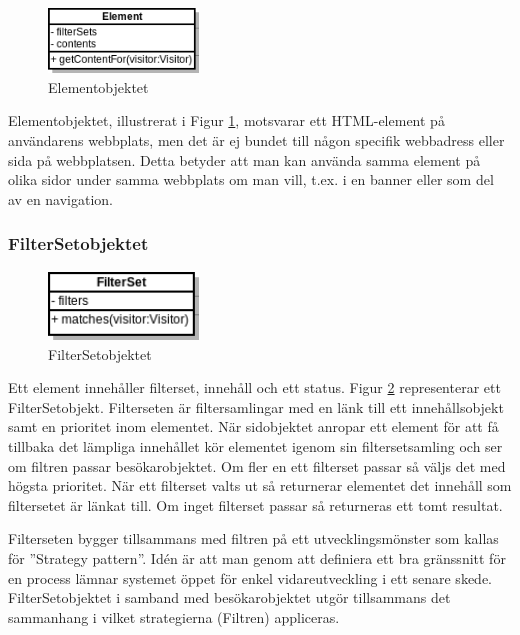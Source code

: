 \begin{figure}[h!]
\centering
\includegraphics[width=40mm]{assets/images/umlElement.png}
\caption{Elementobjektet}
\label{elementuml}
\end{figure}

Elementobjektet, illustrerat i Figur \ref{elementuml}, motsvarar ett HTML-element på användarens webbplats, men det är ej bundet till någon specifik webbadress eller sida på webbplatsen. Detta betyder att man kan använda samma element på olika sidor under samma webbplats om man vill, t.ex. i en banner eller som del av en navigation.

\subsubsection{FilterSetobjektet}

\begin{figure}[h!]
\centering
\includegraphics[width=40mm]{assets/images/umlFilterSet.png}
\caption{FilterSetobjektet}
\label{filtersetuml}
\end{figure}

Ett element innehåller filterset, innehåll och ett status. Figur \ref{filtersetuml} representerar ett FilterSetobjekt. Filterseten är filtersamlingar med en länk till ett innehållsobjekt samt en prioritet inom elementet. När sidobjektet anropar ett element för att få tillbaka det lämpliga innehållet kör elementet igenom sin filtersetsamling och ser om filtren passar besökarobjektet. Om fler en ett filterset passar så väljs det med högsta prioritet. När ett filterset valts ut så returnerar elementet det innehåll som filtersetet är länkat till. Om inget filterset passar så returneras ett tomt resultat.

Filterseten bygger tillsammans med filtren på ett utvecklingsmönster som kallas för ''Strategy pattern''. Idén är att man genom att definiera ett bra gränssnitt för en process lämnar systemet öppet för enkel vidareutveckling i ett senare skede. \citep[s. 349]{gof} FilterSetobjektet i samband med besökarobjektet utgör tillsammans det sammanhang i vilket strategierna (Filtren) appliceras.

